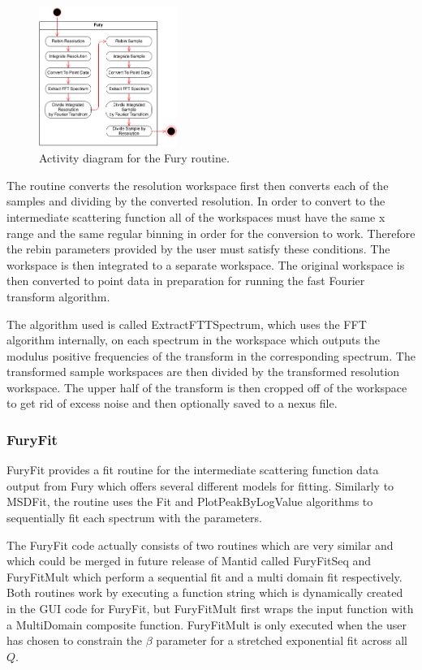 \documentclass[paper=a4, fontsize=11pt]{scrartcl}	%
\numberwithin{equation}{section}															%
\numberwithin{figure}{section}																%
\numberwithin{table}{section}																%
\begin{document}
\begin{figure}[H]
\centering
\includegraphics[width=0.4\textwidth]{img/uml/activity_diagrams/Fury_activity.png}
\caption{Activity diagram for the Fury routine.}
\label{fig:fury-activity-diagram}
\end{figure}


The routine converts the resolution workspace first then converts each of the samples and dividing by the converted resolution. In order to convert to the intermediate scattering function all of the workspaces must have the same x range and the same regular binning in order for the conversion to work. Therefore the rebin parameters provided by the user must satisfy these conditions. The workspace is then integrated to a separate workspace. The original workspace is then converted to point data in preparation for running the fast Fourier transform algorithm.

The algorithm used is called ExtractFTTSpectrum, which uses the  FFT algorithm internally, on each spectrum in the workspace which outputs the modulus positive frequencies of the transform in the corresponding spectrum. The transformed sample workspaces are then divided by the transformed resolution workspace. The upper half of the transform is then cropped off of the workspace to get rid of excess noise and then optionally saved to a nexus file.

\subsubsection{FuryFit}
FuryFit provides a fit routine for the intermediate scattering function data output from Fury which offers several different models for fitting. Similarly to MSDFit, the routine uses the Fit and PlotPeakByLogValue algorithms to sequentially fit each spectrum with the parameters.

The FuryFit code actually consists of two routines which are very similar and which could be merged in future release of Mantid called FuryFitSeq and FuryFitMult which perform a sequential fit and a multi domain fit respectively. Both routines work by executing a function string which is dynamically created in the GUI code for FuryFit, but FuryFitMult first wraps the input function with a MultiDomain composite function. FuryFitMult is only executed when the user has chosen to constrain the $\beta$ parameter for a stretched exponential fit across all $Q$.
\end{document}
